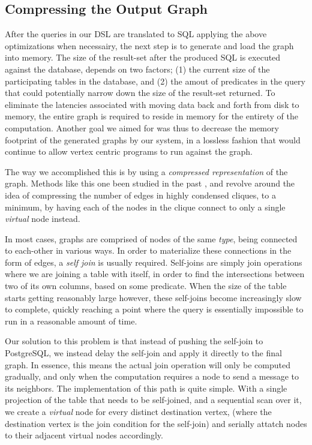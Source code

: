 \documentclass[11pt,letterpaper]{article}
\begin{document}
\subsection*{Compressing the Output Graph}

After the queries in our DSL are translated to SQL applying the above optimizations when necessairy, the next step is to generate and load the graph into memory. The size of the result-set after the produced SQL is executed against the database, depends on two factors; (1) the current size of the participating tables in the database, and (2) the amout of predicates in the query that could potentially narrow down the size of the result-set returned. To eliminate  the latencies associated with moving data back and forth from disk to memory, the entire graph is required to reside in memory for the entirety of the computation. Another goal we aimed for was thus to decrease the memory footprint of the generated graphs by our system, in a lossless fashion that would continue to allow vertex centric programs to run against the graph.

The way we accomplished this is by using a \textit{compressed representation} of the graph. Methods like this one been studied in the past \cite{feder_1995}, and revolve around the idea of compressing the number of edges in highly condensed cliques, to a minimum, by having each of the nodes in the clique connect to only a single \textit{virtual} node instead.

In most cases, graphs are comprised of nodes of the same \textit{type}, being connected to each-other in various ways. In order to materialize these connections in the form of edges, a \textit{self join} is usually required. Self-joins are simply join operations where we are joining a table with itself, in order to find the intersections between two of its own columns, based on some predicate. When the size of the table starts getting reasonably large however, these self-joins become increasingly slow to complete, quickly reaching a point where the query is essentially impossible to run in a reasonable amount of time.

Our solution to this problem is that instead of pushing the self-join to PostgreSQL, we instead delay the self-join and apply it directly to the final graph. In essence, this means the actual join operation will only be computed gradually, and only when the computation requires a node to send a message to its neighbors. The implementation of this path is quite simple. With a single projection of the table that needs to be self-joined, and a sequential scan over it, we create a \textit{virtual} node for every distinct destination vertex, (where the destination vertex is the join condition for the self-join) and serially attatch nodes to their adjacent virtual nodes accordingly.
\end{document}

